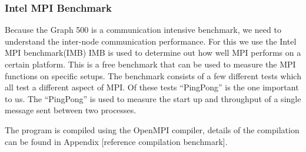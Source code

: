 \subsubsection{Intel MPI Benchmark}
\label{tools-imb}
Because the Graph 500 is a communication intensive benchmark, we need to understand the inter-node communication performance. For this we use the Intel MPI benchmark(IMB)  
IMB is used to determine out how well MPI performs on a certain platform. This is a free benchmark that can be used to measure the MPI functions on specific setups. The benchmark consists of a few different tests which all test a different aspect of MPI. Of these tests ``PingPong'' is the one important to us. The ``PingPong'' is used to measure the start up and throughput of a single message sent between two processes\cite{img-userguide}.

 The program is compiled using the OpenMPI compiler, details of the compilation can be found in Appendix [reference compilation benchmark].

